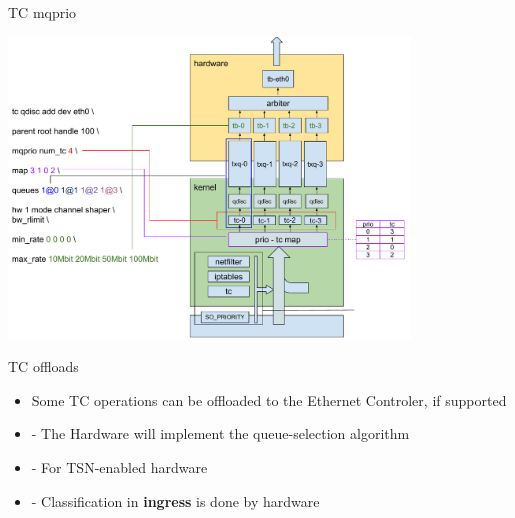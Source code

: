 \begin{frame}{TC mqprio}
	\begin{center}
		\includegraphics[width=0.8\textwidth]{slides/networking-traffic-control/TX_path_tc_mqprio.pdf}
	\end{center}
\end{frame}

\begin{frame}{TC offloads}
	\begin{itemize}
		\item Some TC operations can be offloaded to the Ethernet Controler, if supported
		\item {} - The Hardware will implement the queue-selection algorithm
		\item {} - For TSN-enabled hardware
		\item {} - Classification in \textbf{ingress} is done by hardware
	\end{itemize}
\end{frame}


